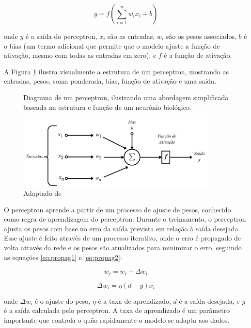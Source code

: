 \begin{equation}
    y = f\left(\sum_{i=1}^{n} w_i x_i + b\right)
    \label{eq:perceptron}
\end{equation}


onde $y$ é a saída do perceptron, $x_i$ são as entradas, $w_i$ são os pesos associados, $b$ é o bias (um termo adicional que permite que o modelo ajuste a função de ativação, mesmo com todas as entradas em zero), e $f$ é a função de ativação.

A Figura \ref{fig:perceptron} ilustra visualmente a estrutura de um perceptron, mostrando as entradas, pesos, soma ponderada, bias, função de ativação e uma saída.

\begin{figure}[hb!]
    \centering  
    \caption{Diagrama de um perceptron, ilustrando uma abordagem simplificada baseada na estrutura e função de um neurônio biológico.} 
    \includegraphics[width=0.9\textwidth]{fig/perceptron.png}
    \caption*{Adaptado de }
    \label{fig:perceptron}
\end{figure}

O perceptron aprende a partir de um processo de ajuste de pesos, conhecido como regra de aprendizagem do perceptron. Durante o treinamento, o perceptron ajusta os pesos com base no erro da saída prevista em relação à saída desejada. Esse ajuste é feito através de um processo iterativo, onde o erro é propagado de volta através da rede e os pesos são atualizados para minimizar o erro, seguindo as equações \ref{eq:propag1} e \ref{eq:propag2}:

\begin{equation}
    w_i = w_i + \Delta w_i
    \label{eq:propag1}
\end{equation}

\begin{equation}
    \Delta w_i = \eta (d - y) x_i
    \label{eq:propag2}
\end{equation}

onde \( \Delta w_i \) é o ajuste do peso, \( \eta \) é a taxa de aprendizado, \( d \) é a saída desejada, e \( y \) é a saída calculada pelo perceptron. A taxa de aprendizado é um parâmetro importante que controla o quão rapidamente o modelo se adapta aos dados.

